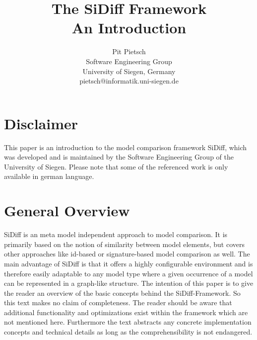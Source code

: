 \documentclass{article}
\begin{document}
\title{The SiDiff Framework
\\ An Introduction}

\author{
       Pit Pietsch\\
       Software Engineering Group\\
       University of Siegen, Germany\\
       pietsch@informatik.uni-siegen.de
}

\maketitle
\newpage

\tableofcontents
\newpage

\section{Disclaimer}
\label{secdisclaimer}
This paper is an introduction to the model comparison framework SiDiff, which was developed and is maintained by the Software Engineering Group 
of the University of Siegen. Please note that some of the referenced work is only available in german language. \newline 

\section{General Overview}
\label{secintro}

SiDiff is an meta model independent approach to model comparison. It is primarily based on the notion of similarity between model elements, but covers 
other approaches like id-based or signature-based model comparison as well. 
The main advantage of SiDiff is that it offers a highly configurable environment and is therefore easily adaptable to any model type where a given 
occurrence of a model can be represented in a graph-like structure. The intention of this paper is to give the reader an overview of the 
basic concepts behind the SiDiff-Framework. So this text makes no claim of completeness. The reader should be aware that additional 
functionality and optimizations exist within the framework which are not mentioned here. Furthermore the text abstracts any concrete implementation 
concepts and technical details as long as the comprehensibility is not endangered.   \\
\end{document}
